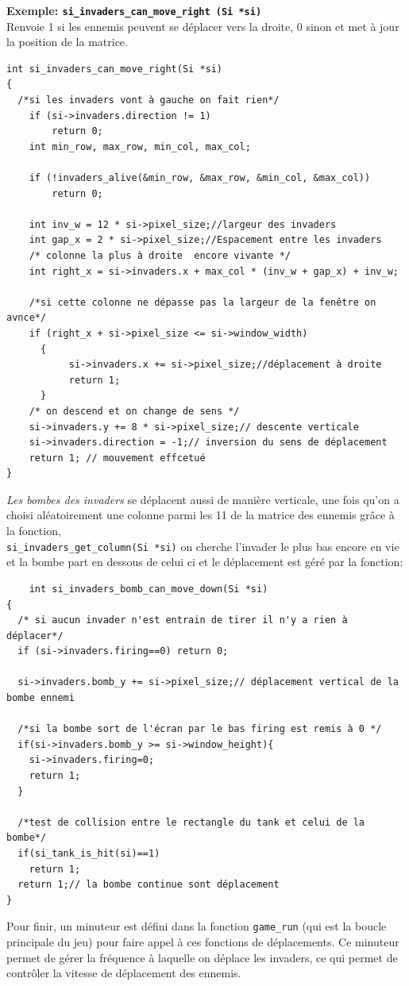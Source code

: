 \documentclass[12pt,a4paper]{report}
\begin{document}
\textbf{Exemple: \texttt{si\_invaders\_can\_move\_right (Si *si)}}
\\ Renvoie 1 si les ennemis peuvent se déplacer vers la droite, 0 sinon et met à jour la position de la matrice.

    \begin{lstlisting}
int si_invaders_can_move_right(Si *si)
{
  /*si les invaders vont à gauche on fait rien*/
    if (si->invaders.direction != 1) 
        return 0;
    int min_row, max_row, min_col, max_col;
   
    if (!invaders_alive(&min_row, &max_row, &min_col, &max_col))
        return 0;

    int inv_w = 12 * si->pixel_size;//largeur des invaders
    int gap_x = 2 * si->pixel_size;//Espacement entre les invaders
    /* colonne la plus à droite  encore vivante */
    int right_x = si->invaders.x + max_col * (inv_w + gap_x) + inv_w;

    /*si cette colonne ne dépasse pas la largeur de la fenêtre on avnce*/
    if (right_x + si->pixel_size <= si->window_width)
      {
	       si->invaders.x += si->pixel_size;//déplacement à droite  
	       return 1; 
      }
    /* on descend et on change de sens */
    si->invaders.y += 8 * si->pixel_size;// descente verticale
    si->invaders.direction = -1;// inversion du sens de déplacement 
    return 1; // mouvement effcetué
}
\end{lstlisting}

\textit{Les bombes des invaders} se déplacent aussi de manière verticale, une fois qu'on a choisi aléatoirement une colonne parmi les 11 de la matrice des ennemis grâce à la fonction,\\ \texttt{si\_invaders\_get\_column(Si *si)} on cherche l'invader le plus bas encore en vie et la bombe part en dessous de celui ci et le déplacement est géré par la fonction:

\begin{lstlisting}
    int si_invaders_bomb_can_move_down(Si *si)
{
  /* si aucun invader n'est entrain de tirer il n'y a rien à déplacer*/
  if (si->invaders.firing==0) return 0;
  
  si->invaders.bomb_y += si->pixel_size;// déplacement vertical de la bombe ennemi

  /*si la bombe sort de l'écran par le bas firing est remis à 0 */
  if(si->invaders.bomb_y >= si->window_height){
    si->invaders.firing=0;
    return 1;
  }

  /*test de collision entre le rectangle du tank et celui de la bombe*/
  if(si_tank_is_hit(si)==1)
    return 1;
  return 1;// la bombe continue sont déplacement 
}
\end{lstlisting}
    Pour finir, un minuteur est défini dans la fonction \texttt{game\_run} (qui est la boucle principale du jeu) pour faire appel à ces fonctions de déplacements. Ce minuteur permet de gérer la fréquence à laquelle on déplace les invaders, ce qui permet de contrôler la vitesse de déplacement des ennemis.
\end{document}

